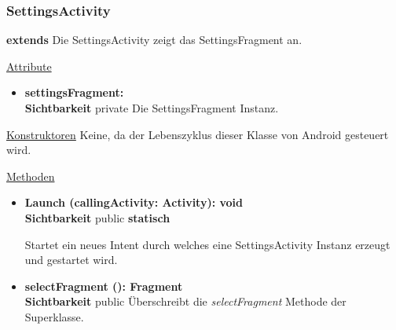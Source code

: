 \subsubsection{SettingsActivity} \label{app:klasse:SettingsActivity}
\textbf{extends}  \newline
Die SettingsActivity zeigt das SettingsFragment an.
\newline

\underline{Attribute}
\begin{itemize}
\itemsep0pt
\item \textbf{settingsFragment: } \hfill\\ 
\textbf{Sichtbarkeit} private\newline
Die SettingsFragment Instanz.

\end{itemize}

\underline{Konstruktoren}\newline
\indent Keine, da der Lebenszyklus dieser Klasse von Android gesteuert wird.\newline

\underline{Methoden}
\begin{itemize}
\itemsep0pt

\item \textbf{Launch (callingActivity: Activity): void}\hfill\\
\textbf{Sichtbarkeit} public \newline
\textbf{statisch} 

Startet ein neues Intent durch welches eine SettingsActivity Instanz erzeugt und gestartet wird.

\item \textbf{selectFragment (): Fragment}\hfill\\
\textbf{Sichtbarkeit} public\newline
Überschreibt die \textit{selectFragment} Methode der Superklasse.

\end{itemize}